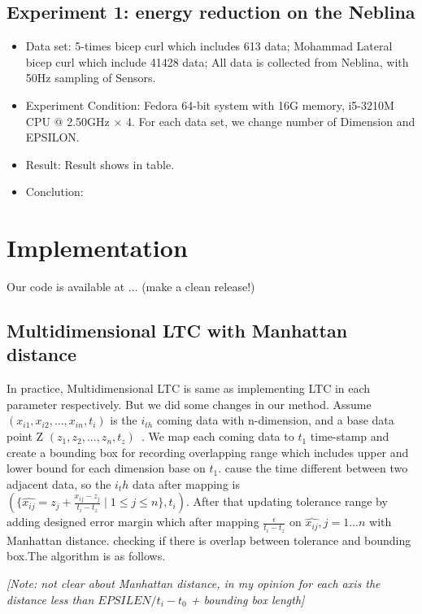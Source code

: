 \documentclass[10pt, conference, compsocconf]{IEEEtran}
\newcommand{\note}[1]{
  \color{blue}\emph{[Note: #1]}
  \color{black}
}
\begin{document}
\subsection{Experiment 1: energy reduction on the Neblina}
\begin{itemize}
    \item Data set: 5-times bicep curl which includes 613 data; 
                    Mohammad Lateral bicep curl which include 41428 data; 
                    All data is collected from Neblina, with 50Hz sampling of Sensors.
    \item Experiment Condition: Fedora 64-bit system with 16G memory, i5-3210M CPU @ 2.50GHz × 4. For each data set, we change number of Dimension and EPSILON.
    \item Result: Result shows in table.
    \item Conclution: 
\end{itemize}

\section{Implementation}
Our code is available at ... (make a clean release!)

\subsection{Multidimensional LTC with Manhattan distance}
In practice, Multidimensional LTC is same as implementing LTC in each parameter respectively. But we did some changes in our method. Assume $(x_{i1}, x_{i2}, ..., x_{in},t_i)$ is the $i_{th}$ coming data with n-dimension, and a base data point Z  $(z_{1}, z_{2}, ..., z_{n},t_z)$~\cite{schoellhammer2004lightweight}. We map each coming data to $t_1$ time-stamp and create a bounding box for recording overlapping range which includes upper and lower bound for each dimension base on $t_1$. cause the time different between two adjacent data, so the $i_th$ data after mapping is $(\{\hat{x_{ij}}=z_j + \frac{x_{ij}-z_{j}}{t_i-t_z} \mid1\leqslant{j}\leqslant{n}\},t_i)$. After that updating tolerance range by adding designed error margin which after mapping $\frac{\epsilon}{t_i-t_z}$ on $\hat{x_{ij}}, j={1...n}$ with Manhattan distance. checking if there is overlap between tolerance and bounding box.The algorithm is as follows.
\note{not clear about Manhattan distance, in my opinion for each axis the distance less than $EPSILEN/t_i-t_0$ + bounding box length}
\end{document}
